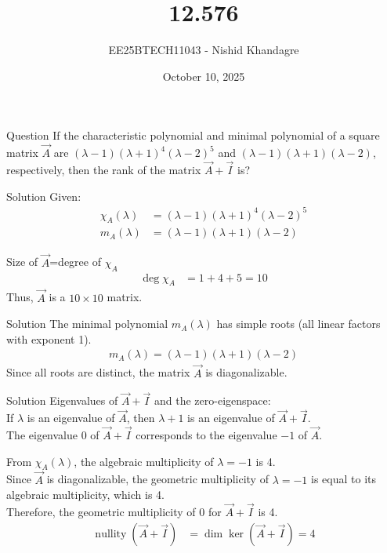 \documentclass{beamer}
\title
{12.576}
\date{October 10, 2025}
\author
{EE25BTECH11043 - Nishid Khandagre}
\begin{document}
\frame{\titlepage}

\begin{frame}{Question}
If the characteristic polynomial and minimal polynomial of a square matrix $\vec{A}$ are $(\lambda-1)(\lambda+1)^4(\lambda-2)^5$ and $(\lambda-1)(\lambda+1)(\lambda-2)$, respectively, then the rank of the matrix $\vec{A}+\vec{I}$ is?
\end{frame}

\begin{frame}{Solution}
Given:
\begin{align}
\chi_A(\lambda) &= (\lambda-1)(\lambda+1)^4(\lambda-2)^5 \\
m_A(\lambda) &= (\lambda-1)(\lambda+1)(\lambda-2)
\end{align}

Size of $\vec{A}$=degree of $\chi_A$
\begin{align}
\deg\chi_A &= 1+4+5 = 10
\end{align}
Thus, $\vec{A}$ is a $10 \times 10$ matrix.
\end{frame}

\begin{frame}{Solution}
The minimal polynomial $m_A(\lambda)$ has simple roots (all linear factors with exponent 1).
\begin{align}
m_A(\lambda) = (\lambda-1)(\lambda+1)(\lambda-2)
\end{align}
Since all roots are distinct, the matrix $\vec{A}$ is diagonalizable.
\end{frame}

\begin{frame}{Solution}
Eigenvalues of $\vec{A}+\vec{I}$ and the zero-eigenspace:\\

If $\lambda$ is an eigenvalue of $\vec{A}$, then $\lambda+1$ is an eigenvalue of $\vec{A}+\vec{I}$.\\

The eigenvalue 0 of $\vec{A}+\vec{I}$ corresponds to the eigenvalue $-1$ of $\vec{A}$.

From $\chi_A(\lambda)$, the algebraic multiplicity of $\lambda=-1$ is 4.\\

Since $\vec{A}$ is diagonalizable, the geometric multiplicity of $\lambda=-1$ is equal to its algebraic multiplicity, which is 4.\\

Therefore, the geometric multiplicity of 0 for $\vec{A}+\vec{I}$ is 4.
\begin{align}
\operatorname{nullity}(\vec{A}+\vec{I}) &= \dim\ker(\vec{A}+\vec{I}) = 4
\end{align}
\end{frame}
\end{document}

